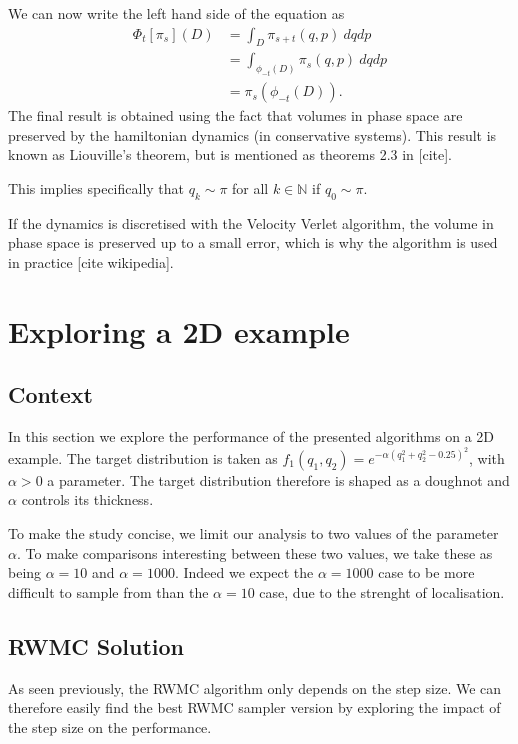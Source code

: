 \documentclass[a4paper, 12pt,oneside]{article}
\begin{document}
			We can now write the left hand side of the equation as
			\begin{align}
				\Phi_t[\pi_s](D)&=\int_D \pi_{s+t}(q,p)\ dqdp \\
					&=\int_{\phi_{-t}(D)}\pi_{s}(q,p)\ dqdp \\
					&=\pi_s(\phi_{-t}(D)).
			\end{align}
			The final result is obtained using the fact that volumes in phase space are preserved by the hamiltonian dynamics (in conservative systems). This result is known as Liouville's theorem, but is mentioned as theorems 2.3 in [cite].
	
			This implies specifically that $q_k\sim\pi$ for all $k\in\mathbb{N}$ if $q_0\sim \pi$. 
	
			If the dynamics is discretised with the Velocity Verlet algorithm, the volume in phase space is preserved up to a small error, which is why the algorithm is used in practice [cite wikipedia].
	\section{Exploring a 2D example}
		\subsection{Context}
		In this section we explore the performance of the presented algorithms on a 2D example. The target distribution is taken as $f_1(q_1,q_2)=e^{-\alpha(q_1^2+q_2^2-0.25)^2}$, with $\alpha>0$ a parameter. The target distribution therefore is shaped as a doughnot and $\alpha$ controls its thickness. 
		
		To make the study concise, we limit our analysis to two values of the parameter $\alpha$. To make comparisons interesting between these two values, we take these as being $\alpha =10$ and $\alpha=1000$. Indeed we expect the $\alpha=1000$ case to be more difficult to sample from than the $\alpha=10$ case, due to the strenght of localisation.
		\subsection{RWMC Solution}
			As seen previously, the RWMC algorithm only depends on the step size. We can therefore easily find the best RWMC sampler version by exploring the impact of the step size on the performance. 
			
\end{document}
